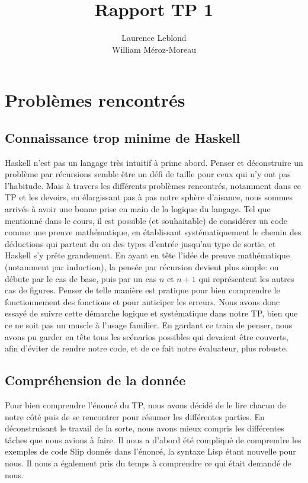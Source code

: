 \documentclass{article}
\title{Rapport TP 1}
\author{Laurence Leblond \\ William Méroz-Moreau}
\begin{document}
	\maketitle

	\section{Problèmes rencontrés}

	\subsection{Connaissance trop minime de Haskell}

	Haskell n'est pas un langage très intuitif à prime abord. Penser et déconstruire
	un problème par récursions semble être un défi de taille pour ceux qui n'y ont
	pas l'habitude. Mais à travers les différents problèmes rencontrés, notamment dans
	ce TP et les devoirs, en élargissant pas à pas notre sphère d'aisance, nous sommes
	arrivés à avoir une bonne prise en main de la logique du langage. Tel que
	mentionné dans le cours, il est possible (et souhaitable) de considérer un code
	comme une preuve mathématique, en établissant systématiquement le chemin des
	déductions qui partent du ou des types d'entrée jusqu'au type de sortie, et Haskell
	s'y prête grandement. En ayant en tête l'idée de preuve mathématique (notamment
	par induction), la pensée par récursion devient plus simple: on débute par le
	cas de base, puis par un cas $n$ et $n+1$ qui représentent les autres cas de figures.
	Penser de telle manière est pratique pour bien comprendre le fonctionnement
	des fonctions et pour anticiper les erreurs. Nous avons donc essayé de suivre cette
	démarche logique et systématique dans notre TP, bien que ce ne soit pas un
	muscle à l'usage familier. En gardant ce train de penser, nous avons pu garder
	en tête tous les scénarios possibles qui devaient être couverts, afin d'éviter
	de rendre notre code, et de ce fait notre évaluateur, plus robuste.

	\subsection{Compréhension de la donnée}

	Pour bien comprendre l'énoncé du TP, nous avons décidé de le lire chacun de notre
	côté puis de se rencontrer pour résumer les différentes parties. En
	déconstruisant le travail de la sorte, nous avons mieux compris les différentes
	tâches que nous avions à faire. Il nous a d'abord été compliqué de comprendre
	les exemples de code Slip donnés dans l'énoncé, la syntaxe Lisp étant nouvelle
	pour nous. Il nous a également pris du temps à comprendre ce qui était demandé
	de nous.
\end{document}
